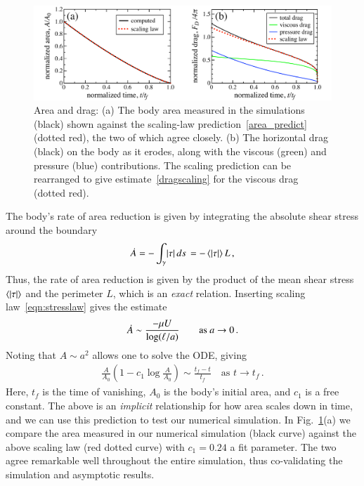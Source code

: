 \documentclass[preprint, 10pt]{elsarticle}
\begin{document}
\begin{figure}%
\begin{center}
\includegraphics[width = 0.9 \textwidth]{./figs/area_drag.pdf}
\caption{Area and drag: (a) The body area measured in the simulations (black) shown against the scaling-law prediction~\eqref{area_predict} (dotted red), the two of which agree closely. (b) The horizontal drag (black) on the body as it erodes, along with the viscous (green) and pressure (blue) contributions. The scaling prediction can be rearranged to give estimate~\eqref{dragscaling} for the viscous drag (dotted red).}
\label{area_drag}
\end{center}
\end{figure}

The body's rate of area reduction is given by integrating the absolute shear stress around the boundary
\begin{align}
\dot{A} = - \int_{\gamma} \lvert \tau \rvert \, ds \,  = - \left< \lvert \tau \rvert \right> L \, ,
\end{align}
Thus, the rate of area reduction is given by the product of the mean shear stress $\left< \lvert \tau \rvert \right>$ and the perimeter $L$, which is an {\em exact} relation. Inserting scaling law~\eqref{eqn:stresslaw} gives the estimate
\begin{align}
\dot{A} \sim \frac{ - \mu U}{\log(\ell/a)} \qquad \text{as } a \to 0 \, . 
\end{align}
Noting that $A \sim a^2$ allows one to solve the ODE, giving
\begin{align}
\label{area_predict}
\frac{A}{A_0} \left( 1 - c_1 \log{\frac{A}{A_0}} \right) \sim \frac{t_f - t}{t_f} \quad \text{as } t \to t_f \, .
\end{align}
Here, $t_f$ is the time of vanishing, $A_0$ is the body's initial area, and $c_1$ is a free constant. The above is an {\em implicit} relationship for how area scales down in time, and we can use this prediction to test our numerical simulation. In Fig.~\ref{area_drag}(a) we compare the area measured in our numerical simulation (black curve) against the above scaling law (red dotted curve) with $c_1 = 0.24$ a fit parameter. The two agree remarkable well throughout the entire simulation, thus co-validating the simulation and asymptotic results.
\end{document}
